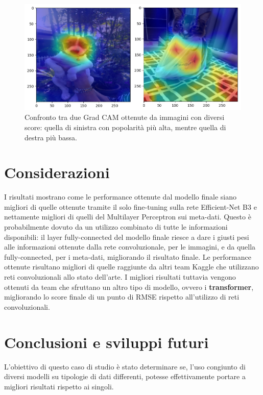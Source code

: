 \begin{figure}[h]
        \centering
        \includegraphics[scale=0.6]{Plot/GRAD-CAM.png}
        \caption{Confronto tra due Grad CAM ottenute da immagini con diversi score: quella di sinistra con popolarità più alta, mentre quella di destra più bassa.}
        \label{fig:grad-cam}
\end{figure}
    


\section{Considerazioni}

I risultati mostrano come le performance ottenute dal modello finale siano migliori di quelle ottenute tramite il solo fine-tuning sulla rete Efficient-Net B3 e nettamente migliori di quelli del Multilayer Perceptron sui meta-dati. Questo è probabilmente dovuto da un utilizzo combinato di tutte le informazioni disponibili: il layer fully-connected del modello finale riesce a dare i giusti pesi alle informazioni ottenute dalla rete convoluzionale, per le immagini, e da quella fully-connected, per i meta-dati, migliorando il risultato finale. Le performance ottenute risultano migliori di quelle raggiunte da altri team Kaggle che utilizzano reti convoluzionali allo stato dell'arte. I migliori risultati tuttavia vengono ottenuti da team che sfruttano un altro tipo di modello, ovvero i \textbf{transformer}, migliorando lo score finale di un punto di RMSE rispetto all'utilizzo di reti convoluzionali.


\section{Conclusioni e sviluppi futuri}
L'obiettivo di questo caso di studio è stato determinare se, l'uso congiunto di diversi modelli su tipologie di dati differenti, potesse effettivamente portare  a migliori risultati rispetto ai singoli.

